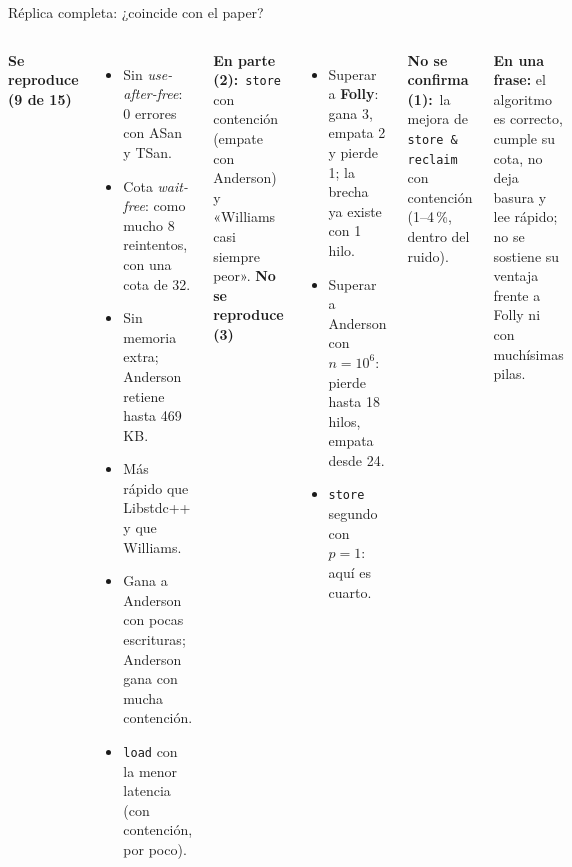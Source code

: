 \begin{frame}{Réplica completa: ¿coincide con el paper?}
  \begin{columns}[T]
    \textbf{\textcolor{ok}{Se reproduce (9 de 15)}}
    \begin{itemize}\footnotesize
      \item Sin \emph{use-after-free}: 0 errores con ASan y TSan.
      \item Cota \emph{wait-free}: como mucho 8 reintentos, con una cota de 32.
      \item Sin memoria extra; Anderson retiene hasta 469\,KB.
      \item Más rápido que Libstdc++ y que Williams.
      \item Gana a Anderson con pocas escrituras; Anderson gana con mucha contención.
      \item \texttt{load} con la menor latencia (con contención, por poco).
    \end{itemize}
    \textbf{\textcolor{acento}{En parte (2):}}\ \footnotesize \texttt{store} con contención (empate con Anderson) y «Williams casi siempre peor».
    \textbf{\textcolor{mal}{No se reproduce (3)}}
    \begin{itemize}\footnotesize
      \item Superar a \textbf{Folly}: gana 3, empata 2 y pierde 1; la brecha ya existe con 1 hilo.
      \item Superar a Anderson con $n = 10^6$: pierde hasta 18 hilos, empata desde 24.
      \item \texttt{store} segundo con $p = 1$: aquí es cuarto.
    \end{itemize}
    \textbf{No se confirma (1):}\ \footnotesize la mejora de \texttt{store \& reclaim} con contención (1--4\,\%, dentro del ruido).
    \par\medskip\small
    \textbf{En una frase:} el algoritmo es correcto, cumple su cota, no deja basura y lee rápido; no se sostiene su ventaja frente a Folly ni con muchísimas pilas.
  \end{columns}
\end{frame}

